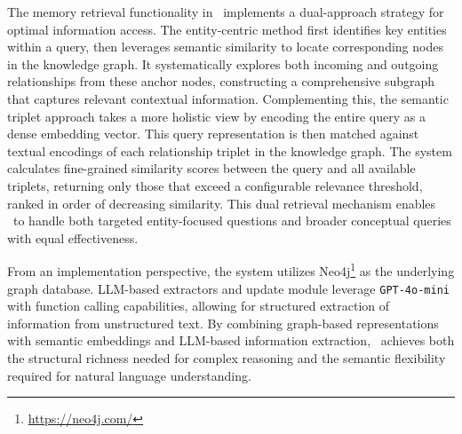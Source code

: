 The memory retrieval functionality in \memp~implements a dual-approach strategy for optimal information access. The entity-centric method first identifies key entities within a query, then leverages semantic similarity to locate corresponding nodes in the knowledge graph. It systematically explores both incoming and outgoing relationships from these anchor nodes, constructing a comprehensive subgraph that captures relevant contextual information. Complementing this, the semantic triplet approach takes a more holistic view by encoding the entire query as a dense embedding vector. This query representation is then matched against textual encodings of each relationship triplet in the knowledge graph. The system calculates fine-grained similarity scores between the query and all available triplets, returning only those that exceed a configurable relevance threshold, ranked in order of decreasing similarity. This dual retrieval mechanism enables \memp~to handle both targeted entity-focused questions and broader conceptual queries with equal effectiveness.

From an implementation perspective, the system utilizes Neo4j\footnote{\url{https://neo4j.com/}} as the underlying graph database. LLM-based extractors and update module leverage \texttt{GPT-4o-mini} with function calling capabilities, allowing for structured extraction of information from unstructured text. By combining graph-based representations with semantic embeddings and LLM-based information extraction, \memp~achieves both the structural richness needed for complex reasoning and the semantic flexibility required for natural language understanding.


